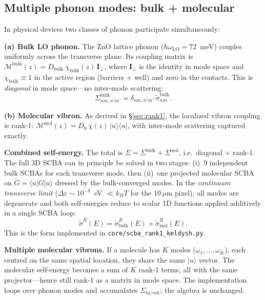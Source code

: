 \documentclass[11pt,a4paper,onecolumn]{article}
\newcommand{\code}[1]{\texttt{\small #1}}
\begin{document}
\subsection{Multiple phonon modes: bulk + molecular}
\label{sec:bulk-mol}
In physical devices two classes of phonon participate simultaneously:

\textbf{(a) Bulk LO phonon.} The ZnO lattice phonon ($\hbar\omega_{\mathrm{LO}} = 72$~meV)
couples uniformly across the transverse plane. Its coupling matrix is
$\mathcal M^{\mathrm{bulk}}(z) = D_{\mathrm{bulk}}\,\chi_{\mathrm{bulk}}(z)\,\mathbf{I}_\perp$,
where $\mathbf{I}_\perp$ is the identity in mode space and $\chi_{\mathrm{bulk}} \equiv 1$
in the active region (barriers + well) and zero in the contacts. This is
\emph{diagonal} in mode space---no inter-mode scattering:
\begin{equation}
\Sigma^{\mathrm{bulk}}_{nm,n'm'} = \delta_{nm,n'm'}\,\tilde\sigma^{\mathrm{bulk}}_{nm}.
\end{equation}

\textbf{(b) Molecular vibron.} As derived in \S\ref{sec:rank1}, the localized
vibron coupling is rank-1: $\mathcal M^{\mathrm{mol}}(z) = D_0\,\chi(z)\,|u\rangle\langle u|$,
with inter-mode scattering captured exactly.

\textbf{Combined self-energy.} The total is $\Sigma = \Sigma^{\mathrm{bulk}} + \Sigma^{\mathrm{mol}}$,
i.e.\ diagonal + rank-1. The full 3D SCBA can in principle be solved in two stages:
(i)~9 independent bulk SCBAs for each transverse mode, then (ii)~one projected
molecular SCBA on $\tilde G = \langle u|G|u\rangle$ dressed by the bulk-converged
modes. In the \emph{continuum transverse limit} ($\Delta\varepsilon \sim 10^{-8}$~eV $\ll k_BT$
for the $10\,\mu$m pixel), all modes are degenerate and both self-energies reduce
to scalar 1D functions applied additively in a single SCBA loop:
\begin{equation}
\tilde\sigma^R(E) = \tilde\sigma^R_{\mathrm{bulk}}(E) + \tilde\sigma^R_{\mathrm{mol}}(E).
\end{equation}
This is the form implemented in \code{core/scba\_rank1\_keldysh.py}.

\textbf{Multiple molecular vibrons.} If a molecule has $K$ modes ($\omega_1, \ldots, \omega_K$),
each centred on the same spatial location, they share the same
$|u\rangle$ vector. The molecular self-energy becomes a sum of $K$ rank-1
terms, all with the same projector---hence still rank-1 as a matrix in
mode space. The implementation loops over phonon modes and accumulates
$\Sigma_{\mathrm{in/out}}$; the algebra is unchanged.
\end{document}
